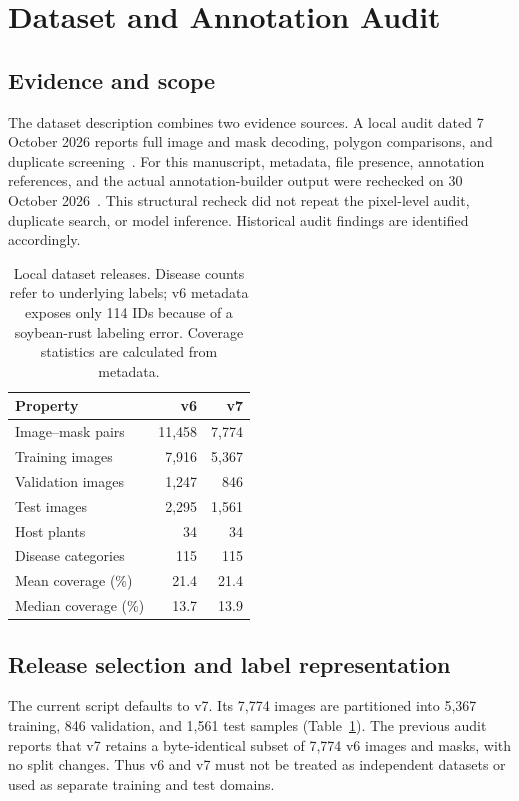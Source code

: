 \section{Dataset and Annotation Audit}
\subsection{Evidence and scope}
The dataset description combines two evidence sources. A local audit dated 7 October 2026 reports full image and mask decoding, polygon comparisons, and duplicate screening~\cite{localaudit}. For this manuscript, metadata, file presence, annotation references, and the actual annotation-builder output were rechecked on 30 October 2026~\cite{snapshot}. This structural recheck did not repeat the pixel-level audit, duplicate search, or model inference. Historical audit findings are identified accordingly.

\begin{table}[t]
\centering\small
\caption{Local dataset releases. Disease counts refer to underlying labels; v6 metadata exposes only 114 IDs because of a soybean-rust labeling error. Coverage statistics are calculated from metadata.}
\label{tab:versions}
\begin{tabular}{lrr}\toprule
Property & v6 & v7\\\midrule
Image--mask pairs & 11,458 & 7,774\\
Training images & 7,916 & 5,367\\
Validation images & 1,247 & 846\\
Test images & 2,295 & 1,561\\
Host plants & 34 & 34\\
Disease categories & 115 & 115\\
Mean coverage (\%) & 21.4 & 21.4\\
Median coverage (\%) & 13.7 & 13.9\\\bottomrule
\end{tabular}
\end{table}

\subsection{Release selection and label representation}
The current script defaults to v7. Its 7,774 images are partitioned into 5,367 training, 846 validation, and 1,561 test samples (Table~\ref{tab:versions}). The previous audit reports that v7 retains a byte-identical subset of 7,774 v6 images and masks, with no split changes. Thus v6 and v7 must not be treated as independent datasets or used as separate training and test domains.

